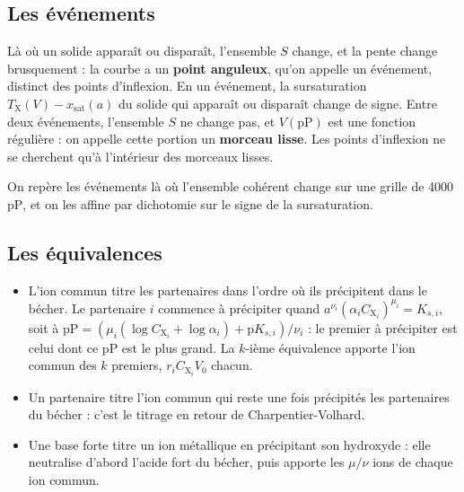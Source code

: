 \documentclass[a4paper,11pt]{article}
\newcommand\gras[1]{\textbf{#1}}
\newcommand\pP{\ensuremath{\mathrm{pP}}\xspace}
\newcommand\pare[1]{\left(#1\right)}
\begin{document}
\subsection{Les événements}
Là où un solide apparaît ou disparaît, l'ensemble $S$ change, et la pente change brusquement : la courbe a un \gras{point anguleux}, qu'on appelle un événement, distinct des points d'inflexion.
En un événement, la sursaturation $T_\mathrm X(V)-x_\text{sat}(a)$ du solide qui apparaît ou disparaît change de signe.
Entre deux événements, l'ensemble $S$ ne change pas, et $V(\pP)$ est une fonction régulière : on appelle cette portion un \gras{morceau lisse}.
Les points d'inflexion ne se cherchent qu'à l'intérieur des morceaux lisses.
\begin{algo}
On repère les événements là où l'ensemble cohérent change sur une grille de 4000 \pP, et on les affine par dichotomie sur le signe de la sursaturation.
\end{algo}

\subsection{Les équivalences}
\begin{itemize}
\item L'ion commun titre les partenaires dans l'ordre où ils précipitent dans le bécher.
Le partenaire $i$ commence à précipiter quand $a^{\nu_i}\pare{\alpha_iC_{\mathrm X_i}}^{\mu_i}=K_{s,i}$, soit à $\pP=\pare{\mu_i\pare{\log C_{\mathrm X_i}+\log\alpha_i}+\mathrm pK_{s,i}}/\nu_i$ : le premier à précipiter est celui dont ce \pP est le plus grand.
La $k$-ième équivalence apporte l'ion commun des $k$ premiers, $r_iC_{\mathrm X_i}V_0$ chacun.
\item Un partenaire titre l'ion commun qui reste une fois précipités les partenaires du bécher : c'est le titrage en retour de Charpentier-Volhard.
\item Une base forte titre un ion métallique en précipitant son hydroxyde : elle neutralise d'abord l'acide fort du bécher, puis apporte les $\mu/\nu$ ions  de chaque ion commun.
\end{itemize}
\end{document}
